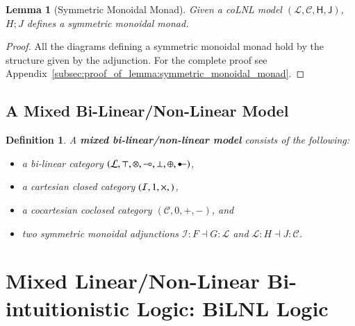 \documentclass{lmcs}
\newtheorem{lemma}[theorem]{Lemma}
\newtheorem{definition}[theorem]{Definition}
\let\to\relax
\newcommand{\to}{\rightarrow}
\newcommand{\cat}[1]{\mathcal{#1}}
\newcommand{\func}[1]{\mathsf{#1}}
\newcommand{\limp}[0]{\multimap}
\newcommand{\colimp}[0]{\multimapdotinv}
\begin{document}
\begin{lemma}[Symmetric Monoidal Monad]
  \label{lemma:symmetric_monoidal_monad}
  Given a coLNL model $(\cat{L},\cat{C},\func{H},\func{J})$, $H;J$
  defines a symmetric monoidal monad.
\end{lemma}
\begin{proof}
  All the diagrams defining a symmetric monoidal monad hold by the
  structure given by the adjunction.  For the complete proof see
  Appendix~\ref{subsec:proof_of_lemma:symmetric_monoidal_monad}.
\end{proof}


\subsection{A Mixed Bi-Linear/Non-Linear Model}
\label{subsec:a_mixed_bi-linear_non-linear_model}
\begin{definition}
  \label{def:biLNL-model}
  A \textbf{mixed bi-linear/non-linear model} consists of the
  following:
  \begin{itemize}
  \item[i.] a bi-linear category $(\cat{L},
    \top,\otimes,\limp,\perp,\oplus,\colimp)$,
  \item[ii.] a cartesian closed category $(\cat{I},1,\times,\to)$,
  \item[iii.] a cocartesian coclosed category $(\cat{C},0,+,-)$, and
  \item[iv.] two symmetric monoidal adjunctions $\cat{I} : F \dashv G
    : \cat{L}$ and $\cat{L} : H \dashv J : \cat{C}$.
  \end{itemize}
\end{definition}


\section{Mixed Linear/Non-Linear Bi-intuitionistic Logic: BiLNL Logic}
\label{sec:bilnl_logic}
\end{document}

